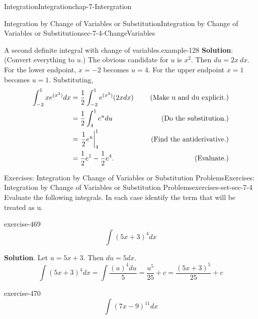\documentclass[oneside,10pt,]{book}
\newcommand{\terminology}[1]{\textbf{#1}}
\numberwithin{equation}{section}
\newcommand{\amp}{&}
\begin{document}
\begin{chapterptx}{Integration}{}{Integration}{}{}{chap-7-Intergration}
\begin{sectionptx}{Integration by Change of Variables or Substitution}{}{Integration by Change of Variables or Substitution}{}{}{sec-7-4-ChangeVariables}
\begin{example}{A second definite integral with change of variables.}{example-128}
\hypertarget{p-2854}{}%
\terminology{Solution}: (Convert everything to \(u\).) The obvious candidate for \(u\) is \(x^2\).  Then \(du=2x\  dx\). For the lower endpoint, \(x=-2\) becomes \(u=4\).  For the upper endpoint \(x=1\) becomes \(u=1\). Substituting,%
%
\begin{equation*}
\begin{aligned}  \int_{-2}^1 x e^{(x^2)}dx
\amp =\frac{1}{2} \int_{-2}^1 e^{(x^2)}(2x dx)
\amp \quad \hbox{ (Make u and du explicit.)}\\ 
\amp =\frac{1}{2} \int_{4}^{1}e^u du
\amp \quad \hbox{ (Do the substitution.)}\\ 
\amp =\left.\frac{1}{2} e^u\right|_4^{1}
\amp \quad \hbox{ (Find the antiderivative.)}\\ 
\amp =\frac{1}{2}  e^1-\frac{1}{2} e^4.
\amp \quad \hbox{ (Evaluate.)}\\ 
\end{aligned}
\end{equation*}
\end{example}
%
%
\typeout{************************************************}
\typeout{************************************************}
%
\begin{exercises-subsection-numberless}{Exercises: Integration by Change of Variables or Substitution Problems}{}{Exercises: Integration by Change of Variables or Substitution Problems}{}{}{exercises-set-sec-7-4}
\hypertarget{p-2855}{}%
Evaluate the following integrals.  In each case identify the term that will be treated as u.%
\begin{divisionexercise}{1}{}{}{exercise-469}%
%
\begin{equation*}
\int (5x+3)^4  dx
\end{equation*}
\par\smallskip%
\noindent\textbf{Solution}.\hypertarget{solution-238}{}\quad%
\hypertarget{p-2856}{}%
Let \(u=5x+3\).  Then \(du=5dx\).%
%
\begin{equation*}
\int (5x+3)^4  dx=\int \frac{(u)^4  du}{5}=\frac{u^5}{25} +c
=\frac{(5x+3)^5}{25} +c
\end{equation*}
\end{divisionexercise}%
\begin{divisionexercise}{2}{}{}{exercise-470}%
%
\begin{equation*}
\int (7x-9)^{11}  dx
\end{equation*}
\end{divisionexercise}%

\end{exercises-subsection-numberless}
\end{sectionptx}
\end{chapterptx}
\end{document}
